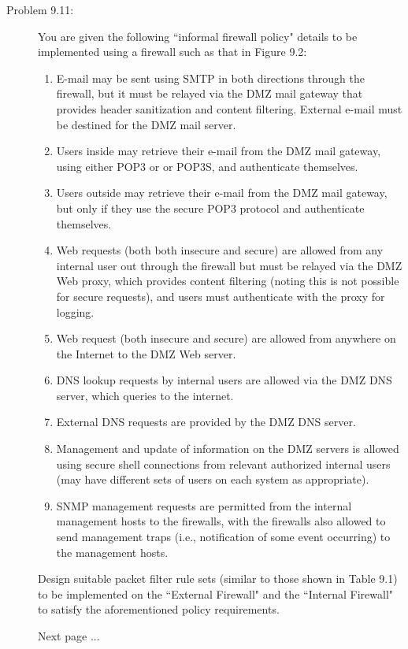 \documentclass[12pt]{article}
\begin{document}
\begin{description}
    
    \item[Problem 9.11:]{\color{grey}You are given the following ``informal firewall policy" details to be implemented using a firewall such as that in Figure 9.2:
    \begin{enumerate}[1.]
        \item E-mail may be sent using SMTP in both directions through the firewall, but it must be relayed via the DMZ mail gateway that provides header sanitization and content filtering.  External e-mail must be destined for the DMZ mail server.
        \item Users inside may retrieve their e-mail from the DMZ mail gateway, using either POP3 or or POP3S, and authenticate themselves.
        \item Users outside may retrieve their e-mail from the DMZ mail gateway, but only if they use the secure POP3 protocol and authenticate themselves.
        \item Web requests (both both insecure and secure) are allowed from any internal user out through the firewall but must be relayed via the DMZ Web proxy, which provides content filtering (noting this is not possible for secure requests), and users must authenticate with the proxy for logging.
        \item Web request (both insecure and secure) are allowed from anywhere on the Internet to the DMZ Web server.
        \item DNS lookup requests by internal users are allowed via the DMZ DNS server, which queries to the internet.
        \item External DNS requests are provided by the DMZ DNS server.
        \item Management and update of information on the DMZ servers is allowed using secure shell connections from relevant authorized internal users (may have different sets of users on each system as appropriate).
        \item SNMP management requests are permitted from the internal management hosts to the firewalls, with the firewalls also allowed to send management traps (i.e., notification of some event occurring) to the management hosts.
    \end{enumerate}
    Design suitable packet filter rule sets (similar to those shown in Table 9.1) to be implemented on the ``External Firewall" and the ``Internal Firewall" to satisfy the aforementioned policy requirements.}\par
    Next page ...\\
    

\end{description}
\end{document}
